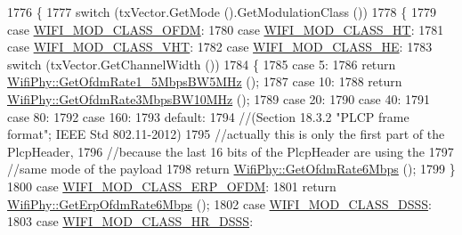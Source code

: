 \begin{DoxyCode}
1776 \{
1777   \textcolor{keywordflow}{switch} (txVector.GetMode ().GetModulationClass ())
1778     \{
1779     \textcolor{keywordflow}{case} \hyperlink{namespacens3_aa999e1221606a2b21b1eb33c2007c217a30a83a0318357c9611f09e6faadc8006}{WIFI\_MOD\_CLASS\_OFDM}:
1780     \textcolor{keywordflow}{case} \hyperlink{namespacens3_aa999e1221606a2b21b1eb33c2007c217a6ac45cac36cc4454649435d24ebf349c}{WIFI\_MOD\_CLASS\_HT}:
1781     \textcolor{keywordflow}{case} \hyperlink{namespacens3_aa999e1221606a2b21b1eb33c2007c217a9863e4342bf5c238c74dddfc4d96c67e}{WIFI\_MOD\_CLASS\_VHT}:
1782     \textcolor{keywordflow}{case} \hyperlink{namespacens3_aa999e1221606a2b21b1eb33c2007c217abfa4f7272510045a9b43e8ac27ac13b0}{WIFI\_MOD\_CLASS\_HE}:
1783       \textcolor{keywordflow}{switch} (txVector.GetChannelWidth ())
1784         \{
1785         \textcolor{keywordflow}{case} 5:
1786           \textcolor{keywordflow}{return} \hyperlink{classns3_1_1WifiPhy_ad52da7bd50e91c3cf45b6a3256b93d37}{WifiPhy::GetOfdmRate1\_5MbpsBW5MHz} ();
1787         \textcolor{keywordflow}{case} 10:
1788           \textcolor{keywordflow}{return} \hyperlink{classns3_1_1WifiPhy_a8c565c787448b738ea94b455169371fa}{WifiPhy::GetOfdmRate3MbpsBW10MHz} ();
1789         \textcolor{keywordflow}{case} 20:
1790         \textcolor{keywordflow}{case} 40:
1791         \textcolor{keywordflow}{case} 80:
1792         \textcolor{keywordflow}{case} 160:
1793         \textcolor{keywordflow}{default}:
1794           \textcolor{comment}{//(Section 18.3.2 "PLCP frame format"; IEEE Std 802.11-2012)}
1795           \textcolor{comment}{//actually this is only the first part of the PlcpHeader,}
1796           \textcolor{comment}{//because the last 16 bits of the PlcpHeader are using the}
1797           \textcolor{comment}{//same mode of the payload}
1798           \textcolor{keywordflow}{return} \hyperlink{classns3_1_1WifiPhy_a9945d5d1e8dd74118f90e1adcb63d6fe}{WifiPhy::GetOfdmRate6Mbps} ();
1799         \}
1800     \textcolor{keywordflow}{case} \hyperlink{namespacens3_aa999e1221606a2b21b1eb33c2007c217afc1f5ef8d2c985f37a3224dd86ab014d}{WIFI\_MOD\_CLASS\_ERP\_OFDM}:
1801       \textcolor{keywordflow}{return} \hyperlink{classns3_1_1WifiPhy_a334689e428371b3383e9001cbd05deba}{WifiPhy::GetErpOfdmRate6Mbps} ();
1802     \textcolor{keywordflow}{case} \hyperlink{namespacens3_aa999e1221606a2b21b1eb33c2007c217aed8070e1ee089724d73fe63030cc112c}{WIFI\_MOD\_CLASS\_DSSS}:
1803     \textcolor{keywordflow}{case} \hyperlink{namespacens3_aa999e1221606a2b21b1eb33c2007c217a3c847bbae970f2de31e7b4eb7ff49840}{WIFI\_MOD\_CLASS\_HR\_DSSS}:

\end{DoxyCode}
